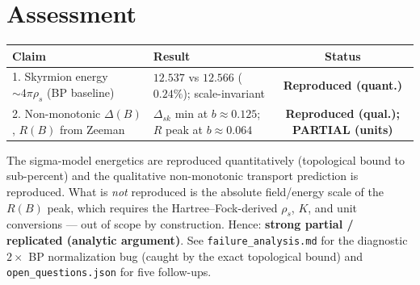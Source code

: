 \documentclass[11pt]{article}
\begin{document}
\section{Assessment}
\begin{table}[htbp]
\centering
\begin{tabular}{p{4.6cm} p{5.2cm} c}
\toprule
Claim & Result & Status \\
\midrule
1. Skyrmion energy $\sim 4\pi\rho_s$ (BP baseline) &
$12.537$ vs $12.566$ ($0.24\%$); scale-invariant &
\textcolor{green!55!black}{\textbf{Reproduced (quant.)}} \\
2. Non-monotonic $\Delta(B)$, $R(B)$ from Zeeman &
$\Delta_{sk}$ min at $b{\approx}0.125$; $R$ peak at $b{\approx}0.064$ &
\textcolor{orange!80!black}{\textbf{Reproduced (qual.); PARTIAL (units)}} \\
\bottomrule
\end{tabular}
\end{table}

\noindent The sigma-model energetics are reproduced quantitatively (topological
bound to sub-percent) and the qualitative non-monotonic transport prediction is
reproduced. What is \emph{not} reproduced is the absolute field/energy scale of
the $R(B)$ peak, which requires the Hartree--Fock-derived $\rho_s$, $K$, and
unit conversions --- out of scope by construction. Hence: \textbf{strong
partial / replicated (analytic argument)}. See
\texttt{failure\_analysis.md} for the diagnostic $2\times$ BP normalization bug
(caught by the exact topological bound) and \texttt{open\_questions.json} for
five follow-ups.
\end{document}

